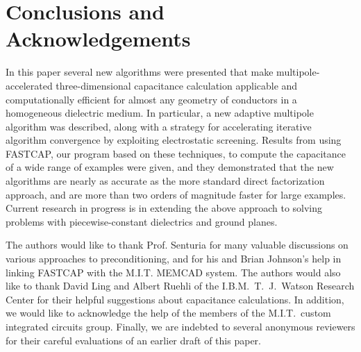 \section{Conclusions and Acknowledgements}
\label{conclu}

In this paper several new algorithms were presented that make
multipole-accelerated three-dimensional capacitance calculation
applicable and computationally efficient for almost any geometry of
conductors in a homogeneous dielectric medium.  In particular, a new
adaptive multipole algorithm was described, along with a strategy for
accelerating iterative algorithm convergence by exploiting
electrostatic screening.  Results from using FASTCAP, our program
based on these techniques, to compute the capacitance of a wide range
of examples were given, and they demonstrated that the new algorithms
are nearly as accurate as the more standard direct factorization
approach, and are more than two orders of magnitude faster for large
examples. Current research in progress is in extending the above
approach to solving problems with piecewise-constant dielectrics and
ground planes.

The authors would like to thank Prof. Senturia for many valuable
discussions on various approaches to preconditioning, and for his and
Brian Johnson's help in linking FASTCAP with the M.I.T.  MEMCAD
system. The authors would also like to thank David Ling and Albert
Ruehli of the I.B.M.\ T.\ J.\ Watson Research Center for their helpful
suggestions about capacitance calculations.  In addition, we would
like to acknowledge the help of the members of the M.I.T.\ custom
integrated circuits group. Finally, we are indebted to several
anonymous reviewers for their careful evaluations of an earlier draft
of this paper.
